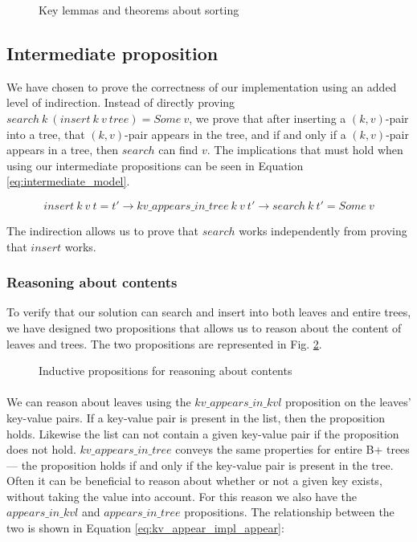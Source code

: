 \begin{figure}
  
  \caption{Key lemmas and theorems about sorting}
  \label{fig:key_sorting_lemmas}
\end{figure}

\subsection{Intermediate proposition}
\label{intermediate_prop}
We have chosen to prove the correctness of our implementation using an added level of indirection. Instead of directly proving $search~k~(insert~k~v~ tree) = Some~v$, we prove that after inserting a $(k, v)$-pair into a tree,
that $(k, v)$-pair appears in the tree, and if and only if a $(k, v)$-pair appears in a tree, then $search$ can find $v$. The implications that must hold when using our intermediate propositions can be seen in Equation \ref{eq:intermediate_model}.

\begin{equation}
  insert~k~v~t = t' \rightarrow kv\_appears\_in\_tree~k~v~t' \rightarrow search~k~t' = Some~v
  \label{eq:intermediate_model}
\end{equation}

The indirection allows us to prove that $search$ works independently from proving that $insert$ works.

\subsubsection{Reasoning about contents}
To verify that our solution can search and insert into both leaves and entire trees, we have designed two propositions that allows us to reason about the content of leaves and trees. The two propositions are represented in Fig. \ref{fig:aik_and_ait}. 

\begin{figure}
  
  \caption{Inductive propositions for reasoning about contents}
  \label{fig:aik_and_ait}
\end{figure}

\paragraph{}
We can reason about leaves using the $kv\_appears\_in\_kvl$ proposition on the leaves' key-value pairs. If a key-value pair is present in the list, then the proposition holds. Likewise the list can not contain a given key-value pair if the proposition does not hold. $kv\_appears\_in\_tree$ conveys the same properties for entire B+ trees --- the proposition holds if and only if the key-value pair is present in the tree. Often it can be beneficial to reason about whether or not a given key exists, without taking the value into account. For this reason we also have the $appears\_in\_kvl$ and $appears\_in\_tree$ propositions. The relationship between the two is shown in Equation \ref{eq:kv_appear_impl_appear}: 

